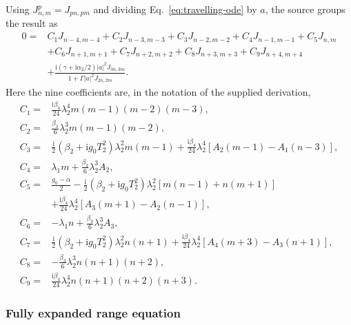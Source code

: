 \documentclass[11pt]{article}
\newcommand{\ii}{\mathrm{i}}
\begin{document}
Using $J_{n,m}^p=J_{pn,pm}$ and dividing Eq.~\eqref{eq:travelling-ode}
by $a$, the source groups the result as
\begin{align}
0={}&C_1J_{n-4,m-4}+C_2J_{n-3,m-3}+C_3J_{n-2,m-2}
+C_4J_{n-1,m-1}+C_5J_{n,m}\nonumber\\
&+C_6J_{n+1,m+1}+C_7J_{n+2,m+2}+C_8J_{n+3,m+3}
+C_9J_{n+4,m+4}\nonumber\\
&+\frac{\ii(\gamma+\ii\alpha_2/2)|a|^2J_{3n,3m}}
{1+\Gamma|a|^2J_{2n,2m}}.
\label{eq:range-rational}
\end{align}
Here the nine coefficients are, in the notation of the supplied derivation,
\begin{align}
C_1={}&\frac{\ii\beta_4}{24}\lambda_2^4m(m-1)(m-2)(m-3),\nonumber\\
C_2={}&\frac{\beta_3}{6}\lambda_2^3m(m-1)(m-2),\nonumber\\
C_3={}&\frac{\ii}{2}(\beta_2+\ii g_0T_2^2)\lambda_2^2m(m-1)
+\frac{\ii\beta_4}{24}\lambda_2^4[A_2(m-1)-A_1(n-3)],\nonumber\\
C_4={}&\lambda_1m+\frac{\beta_3}{6}\lambda_2^3A_2,\nonumber\\
C_5={}&\frac{g_0-\alpha}{2}
-\frac{\ii}{2}(\beta_2+\ii g_0T_2^2)\lambda_2^2[m(n-1)+n(m+1)]\nonumber\\
&+\frac{\ii\beta_4}{24}\lambda_2^4[A_3(m+1)-A_2(n-1)],
\label{eq:C-one-five}\\
C_6={}&-\lambda_1n+\frac{\beta_3}{6}\lambda_2^3A_3,\nonumber\\
C_7={}&\frac{\ii}{2}(\beta_2+\ii g_0T_2^2)\lambda_2^2n(n+1)
+\frac{\ii\beta_4}{24}\lambda_2^4[A_4(m+3)-A_3(n+1)],\nonumber\\
C_8={}&-\frac{\beta_3}{6}\lambda_2^3n(n+1)(n+2),\nonumber\\
C_9={}&\frac{\ii\beta_4}{24}\lambda_2^4n(n+1)(n+2)(n+3).
\label{eq:C-six-nine}
\end{align}

\subsubsection{Fully expanded range equation}
\end{document}

